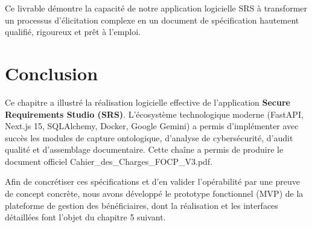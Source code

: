 Ce livrable démontre la capacité de notre application logicielle SRS à transformer un processus d'élicitation complexe en un document de spécification hautement qualifié, rigoureux et prêt à l'emploi.

\section{Conclusion}

Ce chapitre a illustré la réalisation logicielle effective de l'application \textbf{Secure Requirements Studio (SRS)}. L'écosystème technologique moderne (FastAPI, Next.js 15, SQLAlchemy, Docker, Google Gemini) a permis d'implémenter avec succès les modules de capture ontologique, d'analyse de cybersécurité, d'audit qualité et d'assemblage documentaire. Cette chaîne a permis de produire le document officiel {\ttfamily Cahier\allowbreak\_\allowbreak des\allowbreak\_\allowbreak Charges\allowbreak\_\allowbreak FOCP\allowbreak\_\allowbreak V3.pdf}.

Afin de concrétiser ces spécifications et d'en valider l'opérabilité par une preuve de concept concrète, nous avons développé le prototype fonctionnel (MVP) de la plateforme de gestion des bénéficiaires, dont la réalisation et les interfaces détaillées font l'objet du chapitre 5 suivant.

\newpage
